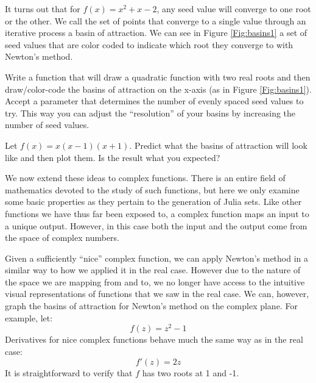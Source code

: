 It turns out that for $f(x) = x^2 + x - 2$, any seed value will converge to one root or the other.  We call the set of points that converge to a single value through an iterative process a basin of attraction.  We can see in Figure \ref{Fig:basins1} a set of seed values that are color coded to indicate which root they converge to with Newton's method.

\begin{problem}
Write a function that will draw a quadratic function with two real roots and then draw/color-code the basins of attraction on the x-axis (as in Figure \ref{Fig:basins1}).  Accept a parameter that determines the number of evenly spaced seed values to try.  This way you can adjust the ``resolution'' of your basins by increasing the number of seed values.
\end{problem}
\begin{problem}
Let $f(x) = x(x-1)(x+1)$.  Predict what the basins of attraction will look like and then plot them.  Is the result what you expected?
\end{problem}


We now extend these ideas to complex functions.  There is an entire field of mathematics devoted to the study of such functions, but here we only examine some basic properties as they pertain to the generation of Julia sets.  Like other functions we have thus far been exposed to, a complex function maps an input to a unique output.  However, in this case both the input and the output come from the space of complex numbers.%

Given a sufficiently ``nice'' complex function, we can apply Newton's method in a similar way to how we applied it in the real case.  However due to the nature of the space we are mapping from and to, we no longer have access to the intuitive visual representations of functions that we saw in the real case.  We can, however, graph the basins of attraction for Newton's method on the complex plane.  For example, let:
\[
f(z) = z^2 - 1
\]
Derivatives for nice complex functions behave much the same way as in the real case:
\[
f'(z) = 2z
\]
It is straightforward to verify that $f$ has two roots at 1 and -1.

